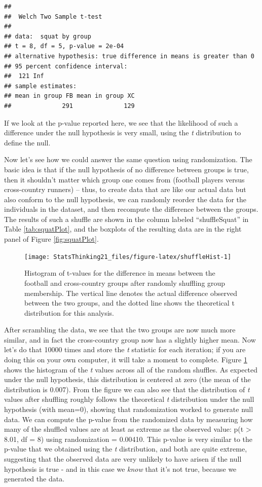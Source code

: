 \documentclass[12pt,]{book}
\theoremstyle{definition}
\theoremstyle{definition}
\theoremstyle{definition}
\theoremstyle{remark}
\begin{document}
\begin{verbatim}
## 
##  Welch Two Sample t-test
## 
## data:  squat by group
## t = 8, df = 5, p-value = 2e-04
## alternative hypothesis: true difference in means is greater than 0
## 95 percent confidence interval:
##  121 Inf
## sample estimates:
## mean in group FB mean in group XC 
##              291              129
\end{verbatim}

If we look at the p-value reported here, we see that the likelihood of such a difference under the null hypothesis is very small, using the \emph{t} distribution to define the null.

Now let's see how we could answer the same question using randomization. The basic idea is that if the null hypothesis of no difference between groups is true, then it shouldn't matter which group one comes from (football players versus cross-country runners) -- thus, to create data that are like our actual data but also conform to the null hypothesis, we can randomly reorder the data for the individuals in the dataset, and then recompute the difference between the groups. The results of such a shuffle are shown in the column labeled ``shuffleSquat'' in Table \ref{tab:squatPlot}, and the boxplots of the resulting data are in the right panel of Figure \ref{fig:squatPlot}.

\begin{figure}
\texttt{[image: StatsThinking21\_files/figure-latex/shuffleHist-1]} \caption{Histogram of t-values for the difference in means between the football and cross-country groups after randomly shuffling group membership.  The vertical line denotes the actual difference observed between the two groups, and the dotted line shows the theoretical t distribution for this analysis.}\label{fig:shuffleHist}
\end{figure}

After scrambling the data, we see that the two groups are now much more similar, and in fact the cross-country group now has a slightly higher mean. Now let's do that 10000 times and store the \emph{t} statistic for each iteration; if you are doing this on your own computer, it will take a moment to complete. Figure \ref{fig:shuffleHist} shows the histogram of the \emph{t} values across all of the random shuffles. As expected under the null hypothesis, this distribution is centered at zero (the mean of the distribution is 0.007). From the figure we can also see that the distribution of \emph{t} values after shuffling roughly follows the theoretical \emph{t} distribution under the null hypothesis (with mean=0), showing that randomization worked to generate null data. We can compute the p-value from the randomized data by measuring how many of the shuffled values are at least as extreme as the observed value: p(t \textgreater{} 8.01, df = 8) using randomization = 0.00410. This p-value is very similar to the p-value that we obtained using the \emph{t} distribution, and both are quite extreme, suggesting that the observed data are very unlikely to have arisen if the null hypothesis is true - and in this case we \emph{know} that it's not true, because we generated the data.
\end{document}
